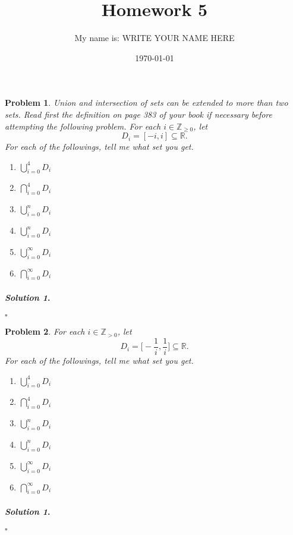 \documentclass{amsart}
\theoremstyle{plain}
\newtheorem{problem}{Problem}
\newenvironment{solution}{\paragraph{\emph{Solution 1}.}}{\hfill$\square$}
\begin{document}
 

\title[Homework 5]{Homework 5}
\author{My name is:  WRITE YOUR NAME HERE}  %
\date{\today} 
\maketitle 

\begin{problem}
Union and intersection of sets can be extended to more than two sets.  Read first the definition on page 383 of your book if necessary before attempting the following problem.  For each $i \in \mathbb{Z}_{\ge 0}$, let
$$D_{i} = [-i,i] \subseteq \mathbb{R}. $$
For each of the followings, tell me what set you get.
\begin{enumerate}
\item $\bigcup\limits_{i=0}^{4} D_{i}$
\item $\bigcap\limits_{i=0}^{4} D_{i}$
\item $\bigcup\limits_{i=0}^{n} D_{i}$
\item $\bigcup\limits_{i=0}^{n} D_{i}$
\item $\bigcup\limits_{i=0}^{\infty}D_{i}$
\item $\bigcap\limits_{i=0}^{\infty}D_{i}$
\end{enumerate} 
\end{problem}
\begin{solution}
\end{solution}

\begin{problem}
For each $i \in \mathbb{Z}_{> 0}$, let
$$D_{i} = \big[-\frac{1}{i},\frac{1}{i}\big] \subseteq \mathbb{R}. $$
For each of the followings, tell me what set you get.
\begin{enumerate}
\item $\bigcup\limits_{i=0}^{4} D_{i}$
\item $\bigcap\limits_{i=0}^{4} D_{i}$
\item $\bigcup\limits_{i=0}^{n} D_{i}$
\item $\bigcup\limits_{i=0}^{n} D_{i}$
\item $\bigcup\limits_{i=0}^{\infty}D_{i}$
\item $\bigcap\limits_{i=0}^{\infty}D_{i}$
\end{enumerate}
\end{problem}
\begin{solution}
\end{solution}
\end{document}
